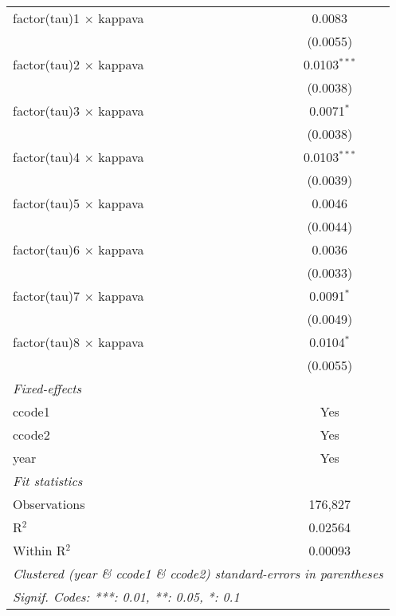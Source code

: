 \begin{tabular}{lc}
   factor(tau)1 $\times$ kappava   & 0.0083\\   
                                   & (0.0055)\\   
   factor(tau)2 $\times$ kappava   & 0.0103$^{***}$\\   
                                   & (0.0038)\\   
   factor(tau)3 $\times$ kappava   & 0.0071$^{*}$\\   
                                   & (0.0038)\\   
   factor(tau)4 $\times$ kappava   & 0.0103$^{***}$\\   
                                   & (0.0039)\\   
   factor(tau)5 $\times$ kappava   & 0.0046\\   
                                   & (0.0044)\\   
   factor(tau)6 $\times$ kappava   & 0.0036\\   
                                   & (0.0033)\\   
   factor(tau)7 $\times$ kappava   & 0.0091$^{*}$\\   
                                   & (0.0049)\\   
   factor(tau)8 $\times$ kappava   & 0.0104$^{*}$\\   
                                   & (0.0055)\\   
   \midrule
   \emph{Fixed-effects}\\
   ccode1                          & Yes\\  
   ccode2                          & Yes\\  
   year                            & Yes\\  
   \midrule
   \emph{Fit statistics}\\
   Observations                    & 176,827\\  
   R$^2$                           & 0.02564\\  
   Within R$^2$                    & 0.00093\\  
   \midrule \midrule
   \multicolumn{2}{l}{\emph{Clustered (year \& ccode1 \& ccode2) standard-errors in parentheses}}\\
   \multicolumn{2}{l}{\emph{Signif. Codes: ***: 0.01, **: 0.05, *: 0.1}}\\
\end{tabular}
\par\endgroup


